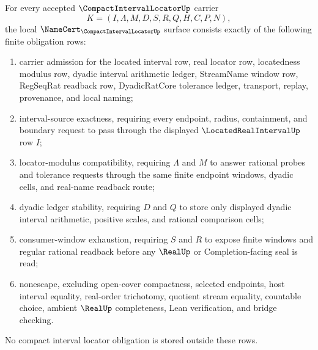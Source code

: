 \begin{theorem}
\label{thm:compact-interval-locator-namecert-obligations}
For every accepted $\CompactIntervalLocatorUp$ carrier
$$
K=(I,\Lambda,M,D,S,R,Q,H,C,P,N),
$$
the local $\NameCert_{\CompactIntervalLocatorUp}$ surface consists exactly of the following finite obligation rows:
\begin{enumerate}
\item carrier admission for the located interval row, real locator row, locatedness modulus row, dyadic interval arithmetic ledger, StreamName window row, RegSeqRat readback row, DyadicRatCore tolerance ledger, transport, replay, provenance, and local naming;
\item interval-source exactness, requiring every endpoint, radius, containment, and boundary request to pass through the displayed $\LocatedRealIntervalUp$ row $I$;
\item locator-modulus compatibility, requiring $\Lambda$ and $M$ to answer rational probes and tolerance requests through the same finite endpoint windows, dyadic cells, and real-name readback route;
\item dyadic ledger stability, requiring $D$ and $Q$ to store only displayed dyadic interval arithmetic, positive scales, and rational comparison cells;
\item consumer-window exhaustion, requiring $S$ and $R$ to expose finite windows and regular rational readback before any $\RealUp$ or Completion-facing seal is read;
\item nonescape, excluding open-cover compactness, selected endpoints, host interval equality, real-order trichotomy, quotient stream equality, countable choice, ambient $\RealUp$ completeness, Lean verification, and bridge checking.
\end{enumerate}
No compact interval locator obligation is stored outside these rows.
\end{theorem}
